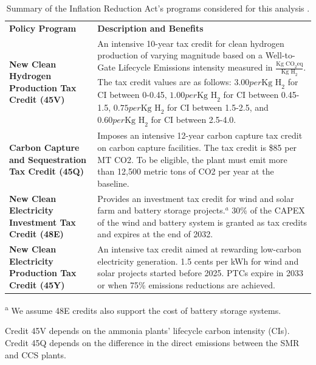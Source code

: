 \documentclass{article}
\begin{document}
\begin{table}[H]
  \centering
  \caption{Summary of the Inflation Reduction Act's programs considered for this analysis \cite{IRA2022}.}
  \label{tab:policy-programs} %
  \begin{threeparttable}
    \begin{tabularx}{\textwidth}{@{}p{4cm}X@{}}
    \toprule
    \textbf{Policy Program} & \textbf{Description and Benefits} \\
    \textbf{New Clean Hydrogen Production Tax Credit (45V)} & An intensive 10-year tax credit for clean hydrogen production of varying magnitude based on a Well-to-Gate Lifecycle Emissions intensity measured in \(\frac{\text{Kg CO}_2\text{eq}}{\text{Kg H}_2}\). The tax credit values are as follows: $3.00 per  \text{Kg H}_2$ for CI between 0-0.45, $1.00 per  \text{Kg H}_2$ for CI between 0.45-1.5, $0.75 per  \text{Kg H}_2$ for CI between 1.5-2.5, and $0.60 per  \text{Kg H}_2$ for CI between 2.5-4.0. \\ 
    \textbf{Carbon Capture and Sequestration Tax Credit (45Q)} & Imposes an intensive 12-year carbon capture tax credit on carbon capture facilities. The tax credit is \$85 per  MT CO2. To be eligible, the plant must emit more than 12,500 metric tons of CO2 per year at the baseline. \\ 
    \textbf{New Clean Electricity Investment Tax Credit (48E)} & Provides an investment tax credit for wind and solar farm and battery storage projects.\(^{a}\) 30\% of the CAPEX of the wind and battery system is granted as tax credits and expires at the end of 2032. \\
    \textbf{New Clean Electricity Production Tax Credit (45Y)} & An intensive tax credit aimed at rewarding low-carbon electricity generation. 1.5 cents per  kWh for wind and solar projects started before 2025. PTCs expire in 2033 or when 75\% emissions reductions are achieved. \\ \bottomrule
    \end{tabularx}
    \begin{tablenotes}
      \footnotesize
      \item \textsuperscript{a} We assume 48E credits also support the cost of battery storage systems.
    \end{tablenotes}
  \end{threeparttable}
\end{table}

Credit 45V depends on the ammonia plants’ lifecycle carbon intensity (CIs). Credit 45Q depends on the difference in the direct emissions between the SMR and CCS plants.
	
\end{document}
